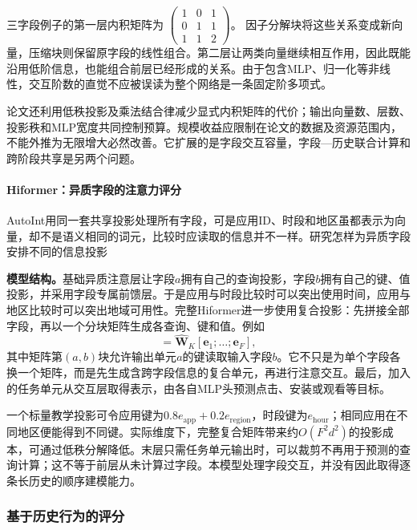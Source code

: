 三字段例子的第一层内积矩阵为
$\left(\begin{smallmatrix}1&0&1\\0&1&1\\1&1&2\end{smallmatrix}\right)$。
因子分解块将这些关系变成新向量，压缩块则保留原字段的线性组合。第二层让两类向量继续相互作用，因此既能沿用低阶信息，也能组合前层已经形成的关系。由于包含MLP、归一化等非线性，交互阶数的直觉不应被误读为整个网络是一条固定阶多项式。

论文还利用低秩投影及乘法结合律减少显式内积矩阵的代价；输出向量数、层数、投影秩和MLP宽度共同控制预算。规模收益应限制在论文的数据及资源范围内，不能外推为无限增大必然改善。它扩展的是字段交互容量，字段—历史联合计算和跨阶段共享是另两个问题。

\paragraph{Hiformer：异质字段的注意力评分}
\label{sec:rs-hiformer}

AutoInt用同一套共享投影处理所有字段，可是应用ID、时段和地区虽都表示为向量，却不是语义相同的词元，比较时应读取的信息并不一样。研究怎样为异质字段安排不同的信息投影

\textbf{模型结构。}基础异质注意层让字段$a$拥有自己的查询投影，字段$b$拥有自己的键、值投影，并采用字段专属前馈层。于是应用与时段比较时可以突出使用时间，应用与地区比较时可以突出地域可用性。完整Hiformer进一步使用复合投影：先拼接全部字段，再以一个分块矩阵生成各查询、键和值。例如
\begin{equation}
 [\bm k_1;\ldots;\bm k_F]=
 \widehat{\bm W}_{K}[\bm e_1;\ldots;\bm e_F],
 \label{eq:rs-hiformer}
\end{equation}
其中矩阵第$(a,b)$块允许输出单元$a$的键读取输入字段$b$。它不只是为单个字段各换一个矩阵，而是先生成含跨字段信息的复合单元，再进行注意交互。最后，加入的任务单元从交互层取得表示，由各自MLP头预测点击、安装或观看等目标。

一个标量教学投影可令应用键为$0.8e_{\mathrm{app}}+0.2e_{\mathrm{region}}$，时段键为$e_{\mathrm{hour}}$；相同应用在不同地区便能得到不同键。实际维度下，完整复合矩阵带来约$O(F^2d^2)$的投影成本，可通过低秩分解降低。末层只需任务单元输出时，可以裁剪不再用于预测的查询计算；这不等于前层从未计算过字段。本模型处理字段交互，并没有因此取得逐条长历史的顺序建模能力。

\subsubsection{基于历史行为的评分}
\label{sec:rs-history-scoring}

